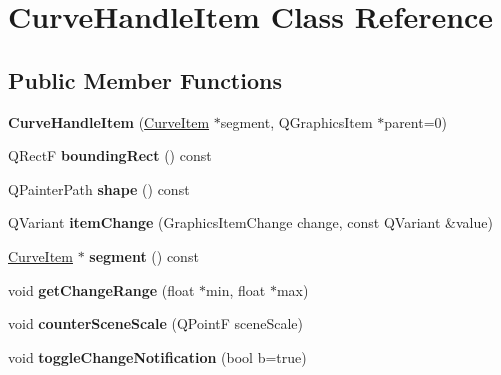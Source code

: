 \hypertarget{class_curve_handle_item}{
\section{\-Curve\-Handle\-Item \-Class \-Reference}
\label{class_curve_handle_item}
}
\subsection*{\-Public \-Member \-Functions}
\begin{DoxyCompactItemize}
\item 
\hypertarget{class_curve_handle_item_a493d0a6c89ef03ba8d0655f7530b18fa}{
{\bfseries \-Curve\-Handle\-Item} (\hyperlink{class_curve_item}{\-Curve\-Item} $\ast$segment, \-Q\-Graphics\-Item $\ast$parent=0)}
\label{class_curve_handle_item_a493d0a6c89ef03ba8d0655f7530b18fa}

\item 
\hypertarget{class_curve_handle_item_ac8dbe63b768c5e738c9d92f13beaa11d}{
\-Q\-Rect\-F {\bfseries bounding\-Rect} () const }
\label{class_curve_handle_item_ac8dbe63b768c5e738c9d92f13beaa11d}

\item 
\hypertarget{class_curve_handle_item_ac4aeb0e7340e05e3ecdc751d3fdfd331}{
\-Q\-Painter\-Path {\bfseries shape} () const }
\label{class_curve_handle_item_ac4aeb0e7340e05e3ecdc751d3fdfd331}

\item 
\hypertarget{class_curve_handle_item_a95eca4ddb77afd55cd6ea68e65867efc}{
\-Q\-Variant {\bfseries item\-Change} (\-Graphics\-Item\-Change change, const \-Q\-Variant \&value)}
\label{class_curve_handle_item_a95eca4ddb77afd55cd6ea68e65867efc}

\item 
\hypertarget{class_curve_handle_item_a07faace220bd114e16a2b94689e75e87}{
\hyperlink{class_curve_item}{\-Curve\-Item} $\ast$ {\bfseries segment} () const }
\label{class_curve_handle_item_a07faace220bd114e16a2b94689e75e87}

\item 
\hypertarget{class_curve_handle_item_a067ca4e89cd12980f2013a255a905c47}{
void {\bfseries get\-Change\-Range} (float $\ast$min, float $\ast$max)}
\label{class_curve_handle_item_a067ca4e89cd12980f2013a255a905c47}

\item 
\hypertarget{class_curve_handle_item_a923b31002e8734db41c96e255c2f03b8}{
void {\bfseries counter\-Scene\-Scale} (\-Q\-Point\-F scene\-Scale)}
\label{class_curve_handle_item_a923b31002e8734db41c96e255c2f03b8}

\item 
\hypertarget{class_curve_handle_item_af9c0e6f04360a6c6e885716fee420152}{
void {\bfseries toggle\-Change\-Notification} (bool b=true)}
\label{class_curve_handle_item_af9c0e6f04360a6c6e885716fee420152}

\end{DoxyCompactItemize}
